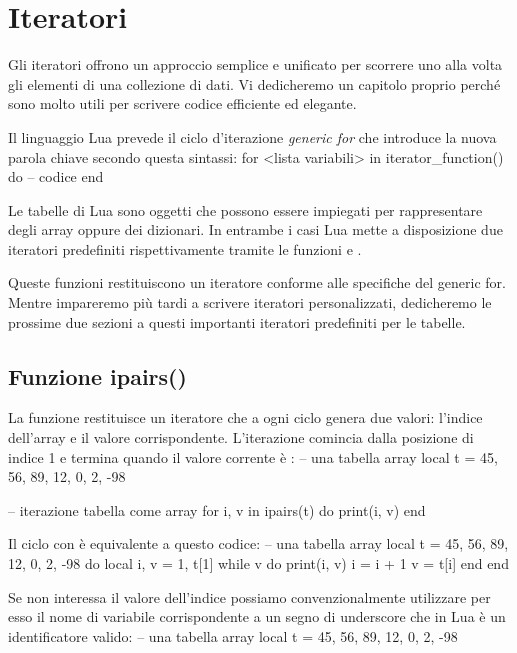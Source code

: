 
\chapter{Iteratori}

Gli iteratori offrono un approccio semplice e unificato per scorrere uno alla
volta gli elementi di una collezione di dati. Vi dedicheremo un capitolo proprio
perché sono molto utili per scrivere codice efficiente ed elegante.

Il linguaggio Lua prevede il ciclo d'iterazione \emph{generic for} che
introduce la nuova parola chiave  secondo questa sintassi:
\lines
for <lista variabili> in iterator_function() do
-- codice
end
\endlines
{}

Le tabelle di Lua sono oggetti che possono essere impiegati per rappresentare
degli array oppure dei dizionari. In entrambe i casi Lua mette a disposizione
due iteratori predefiniti rispettivamente tramite le funzioni  e
.

Queste funzioni restituiscono un iteratore conforme alle specifiche del generic
for. Mentre impareremo più tardi a scrivere iteratori personalizzati,
dedicheremo le prossime due sezioni a questi importanti iteratori predefiniti
per le tabelle.


\section{Funzione ipairs()}

La funzione  restituisce un iteratore che a ogni ciclo genera due
valori: l'indice dell'array e il valore corrispondente. L'iterazione comincia
dalla posizione di indice 1 e termina quando il valore corrente è :
\lines
-- una tabella array
local t = {45, 56, 89, 12, 0, 2, -98}

-- iterazione tabella come array
for i, v in ipairs(t) do
    print(i, v)
end
\endlines
{}

Il ciclo con  è equivalente a questo codice:
\lines
-- una tabella array
local t = {45, 56, 89, 12, 0, 2, -98}
do
    local i, v = 1, t[1]
    while v do
        print(i, v)
        i = i + 1
        v = t[i]
    end
end
\endlines
{}

Se non interessa il valore dell'indice possiamo convenzionalmente utilizzare
per esso il nome di variabile corrispondente a un segno di underscore che in
Lua è un identificatore valido:
\lines
-- una tabella array
local t = {45, 56, 89, 12, 0, 2, -98}

